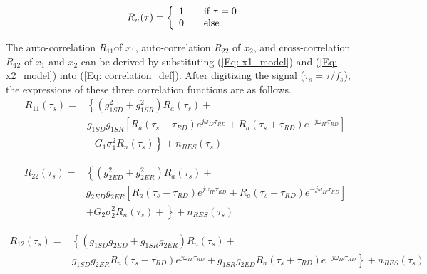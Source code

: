 \documentclass[draftcls,onecolumn]{IEEEtran}  %
\begin{document}
\[ R_n(\tau) = \left\{ 
  \begin{array}{l l}
    1 & \quad \text{if $\tau=0$}\\
    0 & \quad \text{else}
  \end{array} \right.\]


 The auto-correlation $R_{11}$of $x_1$, auto-correlation $R_{22}$ of $x_2$, and cross-correlation $R_{12}$ of $x_1$ and $x_2$ can be derived by substituting (\ref{Eq: x1_model}) and (\ref{Eq: x2_model}) into (\ref{Eq: correlation_def}). After digitizing the signal ($\tau_s = \tau / f_s$), the expressions of these three correlation functions are as follows. 
\begin{equation}
    \begin{split}
	R_{11}(\tau_s) =  & \left\{  
      \left( g^2_{1SD} + g^2_{1SR} \right) R_a(\tau_s) + 
      \right. \\
       & g_{1SD} g_{1SR} 
     \left[ 
          R_a(\tau_s-\tau_{RD})  e^{j\omega_{IF}\tau_{RD}}+ 
          R_a(\tau_s+\tau_{RD}) e^{-j\omega_{IF} \tau_{RD} }
     \right] \\
      &+  \left. G_1\sigma^2_1 R_n(\tau_s)   \right\} 
      + n_{RES}(\tau_s)    
   \label{Eq:R11}
   \end{split}
\end{equation}

\begin{equation}
    \begin{split}
	R_{22}(\tau_s) =  & \left\{  
      \left( g^2_{2ED} + g^2_{2ER} \right) R_a(\tau_s) + 
      \right. \\
       & g_{2ED} g_{2ER} 
     \left[ 
          R_a(\tau_s-\tau_{RD})  e^{j\omega_{IF}\tau_{RD}}+ 
          R_a(\tau_s+\tau_{RD}) e^{-j\omega_{IF} \tau_{RD} }
     \right] \\
      &+  \left. G_2\sigma^2_2 R_n(\tau_s) +   \right\} 
      + n_{RES}(\tau_s)    
   \label{Eq:R22}
   \end{split}
\end{equation}

\begin{equation}
    \begin{split}
    	R_{12}(\tau_s) = & \left\{  
       \left( g_{1SD} g_{2ED} + g_{1SR}g_{2ER} \right) R_a(\tau_s) +
       \right. \\
       & \left. 
       g_{1SD} g_{2ER} R_a(\tau_s-\tau_{RD})  e^{j\omega_{IF} \tau_{RD}}+ 
       g_{1SR} g_{2ED} R_a(\tau_s+\tau_{RD})  e^{-j\omega_{IF} \tau_{RD}}
       \right\} + n_{RES}(\tau_s)    
   \label{Eq:R12}
   \end{split}
\end{equation}
\end{document}
